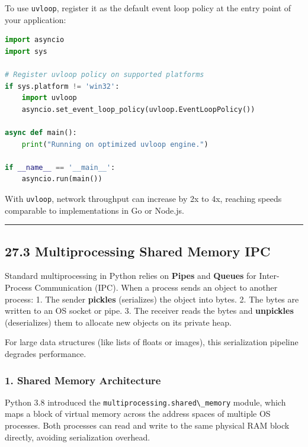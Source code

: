 To use \passthrough{\lstinline!uvloop!}, register it as the default
event loop policy at the entry point of your application:

\begin{lstlisting}[language=Python]
import asyncio
import sys

# Register uvloop policy on supported platforms
if sys.platform != 'win32':
    import uvloop
    asyncio.set_event_loop_policy(uvloop.EventLoopPolicy())

async def main():
    print("Running on optimized uvloop engine.")

if __name__ == '__main__':
    asyncio.run(main())
\end{lstlisting}

With \passthrough{\lstinline!uvloop!}, network throughput can increase
by 2x to 4x, reaching speeds comparable to implementations in Go or
Node.js.

\begin{center}\rule{0.5\linewidth}{0.5pt}\end{center}

\hypertarget{multiprocessing-shared-memory-ipc}{%
\subsection{27.3 Multiprocessing Shared Memory
IPC}\label{multiprocessing-shared-memory-ipc}}

Standard multiprocessing in Python relies on \textbf{Pipes} and
\textbf{Queues} for Inter-Process Communication (IPC). When a process
sends an object to another process: 1. The sender \textbf{pickles}
(serializes) the object into bytes. 2. The bytes are written to an OS
socket or pipe. 3. The receiver reads the bytes and \textbf{unpickles}
(deserializes) them to allocate new objects on its private heap.

For large data structures (like lists of floats or images), this
serialization pipeline degrades performance.

\hypertarget{shared-memory-architecture}{%
\subsubsection{1. Shared Memory
Architecture}\label{shared-memory-architecture}}

Python 3.8 introduced the
\passthrough{\lstinline!multiprocessing.shared\_memory!} module, which
maps a block of virtual memory across the address spaces of multiple OS
processes. Both processes can read and write to the same physical RAM
block directly, avoiding serialization overhead.

